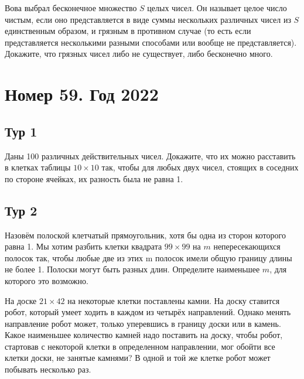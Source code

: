 \documentclass[11pt, a4paper]{common/document_template}
\begin{document}
\begin{exercise}
Вова выбрал бесконечное множество $S$ целых чисел. Он называет целое число чистым, если оно представляется в виде суммы нескольких различных чисел из $S$ единственным образом, и грязным в противном случае (то есть если представляется несколькими разными способами или вообще не представляется). Докажите, что грязных чисел либо не существует, либо бесконечно много.
\end{exercise}


\chapter{Номер 59. Год 2022}

\section{Тур 1}

\begin{exercise}
Даны 100 различных действительных чисел. Докажите, что их можно расставить в клетках таблицы $10 \times 10$ так, чтобы для любых двух чисел, стоящих в соседних по стороне ячейках, их разность была не равна 1.
\end{exercise}

\section{Тур 2}

\begin{exercise}
Назовём полоской клетчатый прямоугольник, хотя бы одна из сторон которого
равна 1. Мы хотим разбить клетки квадрата $99 \times 99$ на $m$ непересекающихся полосок так, чтобы любые две из этих m полосок имели общую границу длины не более 1. Полоски могут быть разных длин. Определите наименьшее $m$, для которого это возможно.
\end{exercise}

\begin{exercise}
На доске $21 \times 42$ на некоторые клетки поставлены камни. На доску ставится робот, который умеет ходить в каждом из четырёх направлений. Однако менять направление робот может, только уперевшись в границу доски или в камень. Какое наименьшее количество камней надо поставить на доску, чтобы робот, стартовав с некоторой клетки в определенном направлении, мог обойти все клетки доски, не занятые камнями? В одной и той же клетке робот может побывать несколько раз.
\end{exercise}
\end{document}
